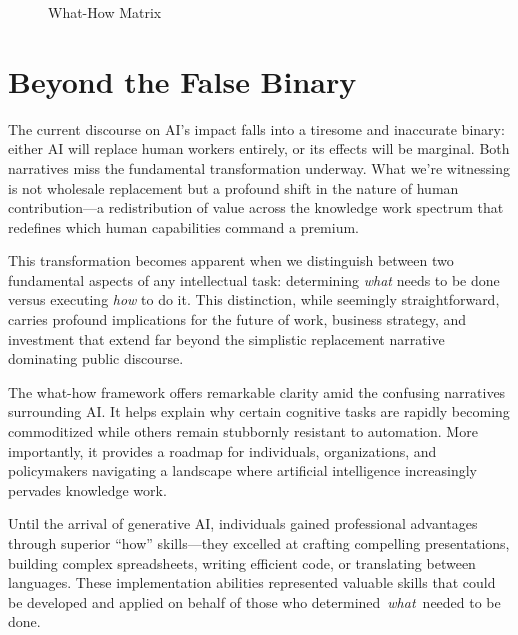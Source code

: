 \documentclass[
  Letterpaper,
]{scrbook}
\begin{document}
\begin{figure}


\caption{\label{fig-what-how-matrix}What-How Matrix}

\end{figure}%

\section{Beyond the False Binary}\label{beyond-the-false-binary}

The current discourse on AI's impact falls into a tiresome and
inaccurate binary: either AI will replace human workers entirely, or its
effects will be marginal. Both narratives miss the fundamental
transformation underway. What we're witnessing is not wholesale
replacement but a profound shift in the nature of human contribution---a
redistribution of value across the knowledge work spectrum that
redefines which human capabilities command a premium.

This transformation becomes apparent when we distinguish between two
fundamental aspects of any intellectual task: determining \emph{what}
needs to be done versus executing \emph{how} to do it. This distinction,
while seemingly straightforward, carries profound implications for the
future of work, business strategy, and
investment that extend far beyond the simplistic replacement narrative
dominating public discourse.

The what-how framework offers remarkable clarity amid the confusing
narratives surrounding AI. It helps explain why certain cognitive tasks
are rapidly becoming commoditized while others remain stubbornly
resistant to automation. More importantly, it provides a roadmap for
individuals, organizations, and policymakers navigating a landscape
where artificial intelligence increasingly pervades knowledge work.

Until the arrival of generative AI,
individuals gained professional advantages through superior ``how''
skills---they excelled at crafting compelling presentations, building
complex spreadsheets, writing efficient code, or translating between
languages. These implementation abilities represented valuable skills
that could be developed and applied on behalf of those who
determined~\emph{what}~needed to be done.
\end{document}
